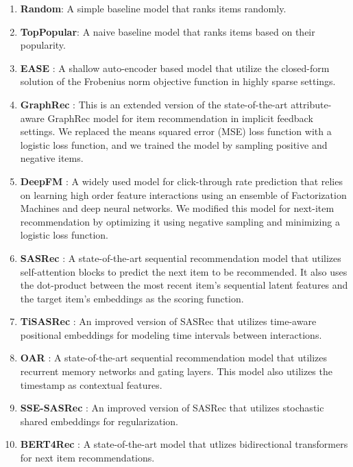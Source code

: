 \documentclass[sigconf,natbib=true]{acmart}
\begin{document}
\begin{enumerate}
 \item \textbf{Random}: A simple baseline model that ranks items randomly.
 \item \textbf{TopPopular}: A naive baseline model that ranks items based on their popularity.
 \item \textbf{EASE} \cite{steck2019embarrassingly}: A shallow auto-encoder based model that utilize the closed-form solution of the Frobenius norm objective function in highly sparse settings.
\item \textbf{GraphRec} \cite{rashed2019attribute}: This is an extended version of the state-of-the-art attribute-aware GraphRec model for item recommendation in implicit feedback settings. We replaced the means squared error (MSE) loss function with a logistic loss function, and we trained the model by sampling positive and negative items. 
 \item \textbf{DeepFM} \cite{guo2017deepfm}: A widely used model for click-through rate prediction that relies on learning high order feature interactions using an ensemble of Factorization Machines and deep neural networks. We modified this model for next-item recommendation by optimizing it using negative sampling and minimizing a logistic loss function.
 
 \item \textbf{SASRec} \cite{kang2018self}: A state-of-the-art sequential recommendation model that utilizes self-attention blocks to predict the next item to be recommended. It also uses the dot-product between the most recent item's sequential latent features and the target item's embeddings as the scoring function.
  \item \textbf{TiSASRec} \cite{li2020time}: An improved version of SASRec that utilizes time-aware positional embeddings for modeling time intervals between interactions.
 \item \textbf{OAR} \cite{wang2020time}: A state-of-the-art sequential recommendation model that utilizes recurrent memory networks and gating layers. This model also utilizes the timestamp as contextual features.
 \item \textbf{SSE-SASRec }\cite{wu2019stochastic}: An improved version of SASRec that utilizes stochastic shared embeddings for regularization.
 \item \textbf{BERT4Rec }\cite{sun2019bert4rec}:  A state-of-the-art model that utlizes bidirectional transformers for next item recommendations.
 

\end{enumerate}
\end{document}
